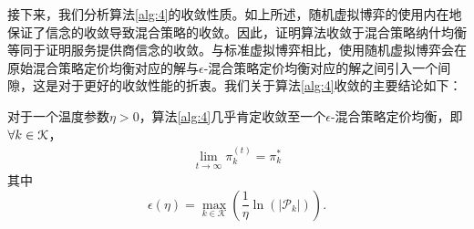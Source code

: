 接下来，我们分析算法\ref{alg:4}的收敛性质。如上所述，随机虚拟博弈的使用内在地保证了信念的收敛导致混合策略的收敛。因此，证明算法收敛于混合策略纳什均衡等同于证明服务提供商信念的收敛。与标准虚拟博弈相比，使用随机虚拟博弈会在原始混合策略定价均衡对应的解与$\epsilon$-混合策略定价均衡对应的解之间引入一个间隙，这是对于更好的收敛性能的折衷。我们关于算法\ref{alg:4}收敛的主要结论如下：
\begin{thm}\label{thm:5}
对于一个温度参数$\eta>0$，算法\ref{alg:4}几乎肯定收敛至一个$\epsilon$-混合策略定价均衡，即$\forall k\in\mathcal{K}$，
\begin{align}
\lim_{t\rightarrow\infty}\pi^{(t)}_k=\pi^*_k
\end{align}
其中
\begin{equation}\label{epsilon}
\epsilon(\eta)=\max_{k\in\mathcal{K}}\left(\frac{1}{\eta}\ln(|\mathcal{P}_k|)\right).
\end{equation}
\end{thm}

